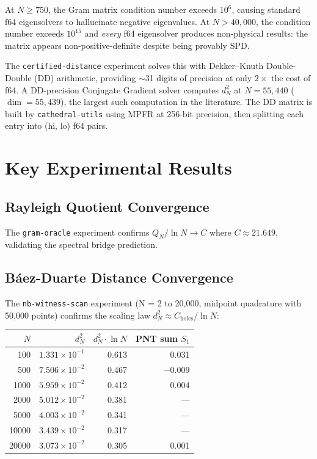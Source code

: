 \documentclass[11pt,a4paper]{article}
\begin{document}
At $N \geq 750$, the Gram matrix condition number exceeds $10^6$,
causing standard f64 eigensolvers to hallucinate negative eigenvalues.
At $N > 40{,}000$, the condition number exceeds $10^{15}$ and
\emph{every} f64 eigensolver produces non-physical results: the
matrix appears non-positive-definite despite being provably SPD.

The \texttt{certified-distance} experiment solves this with
Dekker--Knuth Double-Double (DD) arithmetic, providing $\sim$31 digits
of precision at only $2\times$ the cost of f64. A DD-precision
Conjugate Gradient solver computes $d^2_N$ at $N = 55{,}440$
($\dim = 55{,}439$), the largest such computation in the literature.
The DD matrix is built by \texttt{cathedral-utils} using MPFR at
256-bit precision, then splitting each entry into (hi, lo) f64 pairs.

\section{Key Experimental Results}

\subsection{Rayleigh Quotient Convergence}

The \texttt{gram-oracle} experiment confirms $Q_N/\ln N \to C$
where $C \approx 21.649$, validating the spectral bridge prediction.

\subsection{B\'aez-Duarte Distance Convergence}

The \texttt{nb-witness-scan} experiment (N = 2 to 20{,}000, midpoint
quadrature with 50{,}000 points) confirms the scaling law
$d_N^2 \approx C_{\mathrm{holes}}/\ln N$:

\begin{center}
\begin{tabular}{@{}rrrr@{}}
\toprule
$N$ & $d_N^2$ & $d_N^2 \cdot \ln N$ & PNT sum $S_1$ \\
\midrule
100 & $1.331 \times 10^{-1}$ & 0.613 & 0.031 \\
500 & $7.506 \times 10^{-2}$ & 0.467 & $-0.009$ \\
1000 & $5.959 \times 10^{-2}$ & 0.412 & 0.004 \\
2000 & $5.012 \times 10^{-2}$ & 0.381 & --- \\
5000 & $4.003 \times 10^{-2}$ & 0.341 & --- \\
10000 & $3.439 \times 10^{-2}$ & 0.317 & --- \\
20000 & $3.073 \times 10^{-2}$ & 0.305 & 0.001 \\
\bottomrule
\end{tabular}
\end{center}
\end{document}
